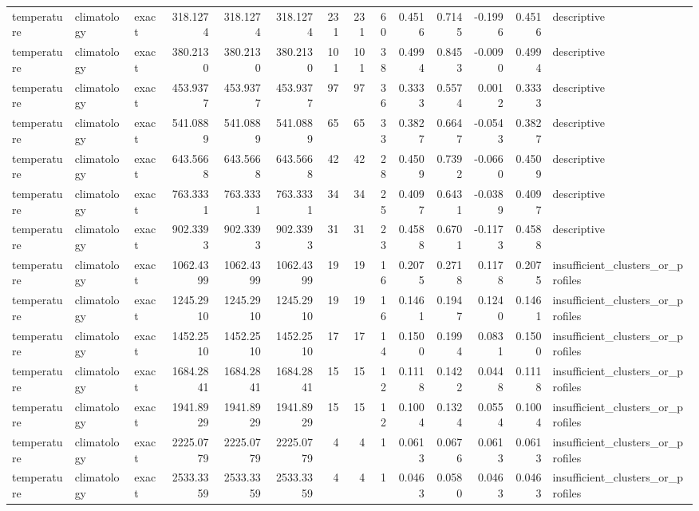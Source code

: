 \begin{tabular}{lllrrrrrrrrrrl}
temperature & climatology & exact & 318.1274 & 318.1274 & 318.1274 & 231 & 231 & 60 & 0.4516 & 0.7145 & -0.1996 & 0.4516 & descriptive \\
temperature & climatology & exact & 380.2130 & 380.2130 & 380.2130 & 101 & 101 & 38 & 0.4994 & 0.8453 & -0.0090 & 0.4994 & descriptive \\
temperature & climatology & exact & 453.9377 & 453.9377 & 453.9377 & 97 & 97 & 36 & 0.3333 & 0.5574 & 0.0012 & 0.3333 & descriptive \\
temperature & climatology & exact & 541.0889 & 541.0889 & 541.0889 & 65 & 65 & 33 & 0.3827 & 0.6647 & -0.0543 & 0.3827 & descriptive \\
temperature & climatology & exact & 643.5668 & 643.5668 & 643.5668 & 42 & 42 & 28 & 0.4509 & 0.7392 & -0.0660 & 0.4509 & descriptive \\
temperature & climatology & exact & 763.3331 & 763.3331 & 763.3331 & 34 & 34 & 25 & 0.4097 & 0.6431 & -0.0389 & 0.4097 & descriptive \\
temperature & climatology & exact & 902.3393 & 902.3393 & 902.3393 & 31 & 31 & 23 & 0.4588 & 0.6701 & -0.1173 & 0.4588 & descriptive \\
temperature & climatology & exact & 1062.4399 & 1062.4399 & 1062.4399 & 19 & 19 & 16 & 0.2075 & 0.2718 & 0.1178 & 0.2075 & insufficient_clusters_or_profiles \\
temperature & climatology & exact & 1245.2910 & 1245.2910 & 1245.2910 & 19 & 19 & 16 & 0.1461 & 0.1947 & 0.1240 & 0.1461 & insufficient_clusters_or_profiles \\
temperature & climatology & exact & 1452.2510 & 1452.2510 & 1452.2510 & 17 & 17 & 14 & 0.1500 & 0.1994 & 0.0831 & 0.1500 & insufficient_clusters_or_profiles \\
temperature & climatology & exact & 1684.2841 & 1684.2841 & 1684.2841 & 15 & 15 & 12 & 0.1118 & 0.1422 & 0.0448 & 0.1118 & insufficient_clusters_or_profiles \\
temperature & climatology & exact & 1941.8929 & 1941.8929 & 1941.8929 & 15 & 15 & 12 & 0.1004 & 0.1324 & 0.0554 & 0.1004 & insufficient_clusters_or_profiles \\
temperature & climatology & exact & 2225.0779 & 2225.0779 & 2225.0779 & 4 & 4 & 1 & 0.0613 & 0.0676 & 0.0613 & 0.0613 & insufficient_clusters_or_profiles \\
temperature & climatology & exact & 2533.3359 & 2533.3359 & 2533.3359 & 4 & 4 & 1 & 0.0463 & 0.0580 & 0.0463 & 0.0463 & insufficient_clusters_or_profiles \\

\end{tabular}

